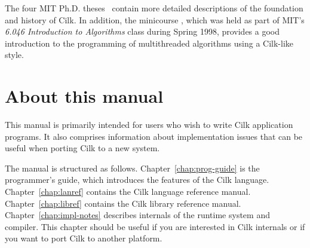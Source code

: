 The four MIT Ph.D. theses~\cite{Blumofe95,Joerg96,Randall98,Frigo99b}
contain more detailed descriptions of the foundation and history of
Cilk.  In addition, the minicourse \cite{LeisersonPr98}, which was
held as part of MIT's \textit{6.046 Introduction to Algorithms} class
during Spring 1998, provides a good introduction to the programming of
multithreaded algorithms using a Cilk-like style.

\section{About this manual}

This manual is primarily intended for users who wish to write Cilk
application programs.  It also comprises information about
implementation issues that can be useful when porting Cilk to a new
system.

The manual is structured as follows.  Chapter~\ref{chap:prog-guide} is
the programmer's guide, which introduces the features of the Cilk
language.  Chapter~\ref{chap:lanref} contains the Cilk language
reference manual.  Chapter~\ref{chap:libref} contains the Cilk library
reference manual.  Chapter~\ref{chap:impl-notes} describes internals
of the \sysnameversion{} runtime system and compiler.  This chapter
should be useful if you are interested in Cilk internals or if you
want to port Cilk to another platform.



